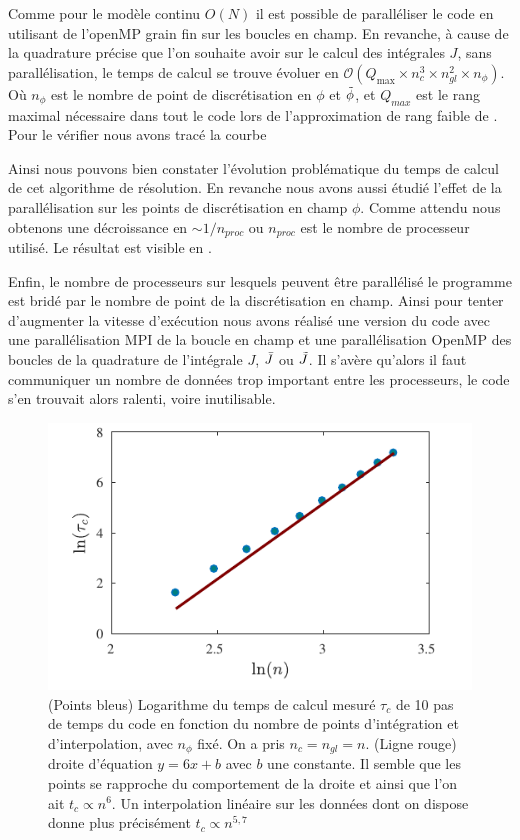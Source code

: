 \documentclass[10pt]{article}
\begin{document}
\begin{multicols}{2}
Comme pour le modèle continu $O(N)$ il est possible de paralléliser le code en utilisant de l'openMP \cite{} grain fin sur les boucles en champ. En revanche, à cause de la quadrature précise que l'on souhaite avoir sur le calcul des intégrales $J$, sans parallélisation, le temps de calcul se trouve évoluer en $\mathcal{O}( Q_\text{max} \times n_c^3 \times n_{gl}^2 \times n_{\phi})$. Où $n_{\phi}$ est le nombre de point de discrétisation en $\phi$ et $\tilde{\phi}$, et $Q_{max}$ est le rang maximal nécessaire dans tout le code lors de l'approximation de rang faible de . Pour le vérifier nous avons tracé la courbe 


Ainsi nous pouvons bien constater l'évolution  problématique du temps de calcul de cet algorithme de résolution. En revanche nous avons aussi étudié l'effet de la parallélisation sur les points de discrétisation en champ $\phi$. Comme attendu nous obtenons une décroissance en $\sim 1/n_{proc}$ ou $n_{proc}$ est le nombre de processeur utilisé. Le résultat est visible en .

Enfin, le nombre de processeurs sur lesquels peuvent être parallélisé le programme est bridé par le nombre de point de la discrétisation en champ. Ainsi pour tenter d'augmenter la vitesse d'exécution nous avons réalisé une version du code avec une parallélisation MPI \cite{} de la boucle en champ et une parallélisation OpenMP des boucles de la quadrature de l'intégrale $J$, $\bar{J}$ ou $\tilde{J}$. Il s'avère qu'alors il faut communiquer un nombre de données trop important entre les processeurs, le code s'en trouvait alors ralenti, voire inutilisable. 

\begin{figure}[H]
\begin{center}
	\includegraphics[width=0.95\columnwidth]{ComplexiteTemps.pdf}
\end{center}
\caption{(Points bleus) Logarithme du temps de calcul mesuré $\tau_c$ de 10 pas de temps du code en fonction du nombre de points d'intégration et d'interpolation, avec $n_\phi$ fixé. On a pris $n_c = n_{gl} = n$. (Ligne rouge) droite d'équation $y=6x+b$ avec $b$ une constante. Il semble que les points se rapproche du comportement de la droite et ainsi que l'on ait $t_c \propto n^6$. Un interpolation linéaire sur les données dont on dispose donne plus précisément $t_c \propto n^{5,7} $   }
\label{fig:timeNc}
\end{figure}



\end{multicols}
\end{document}
